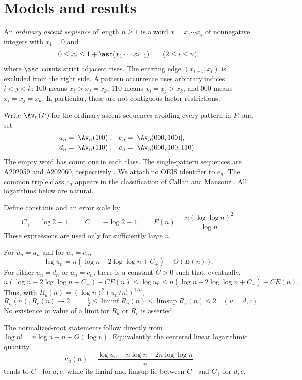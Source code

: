 \section{Models and results}\label{sec:results}
An \emph{ordinary ascent sequence} of length $n\ge1$ is a word $x=x_1\cdots x_n$ of nonnegative integers with $x_1=0$ and
\begin{equation}\label{eq:ascent}
 0\le x_i\le1+\asc(x_1\cdots x_{i-1})\qquad(2\le i\le n),
\end{equation}
where $\asc$ counts strict adjacent rises. The entering edge $(x_{i-1},x_i)$ is excluded from the right side. A pattern occurrence uses arbitrary indices $i<j<k$: $100$ means $x_i>x_j=x_k$, $110$ means $x_i=x_j>x_k$, and $000$ means $x_i=x_j=x_k$. In particular, these are not contiguous-factor restrictions.

Write $\Av_n(P)$ for the ordinary ascent sequences avoiding every pattern in $P$, and set
\begin{align*}
 a_n&=|\Av_n(100)|,&e_n&=|\Av_n(000,100)|,\\
 d_n&=|\Av_n(110)|,&c_n&=|\Av_n(000,100,110)|.
\end{align*}
The empty word has count one in each class. The single-pattern sequences are A202059 and A202060, respectively \cite{conway,oeis100,oeis110}. We attach no OEIS identifier to $e_n$. The common triple class $c_n$ appears in the classification of Callan and Mansour \cite{callan}. All logarithms below are natural.

Define constants and an error scale by
\begin{equation}\label{eq:constants}
 C_+=\log2-1,\qquad C_-=-\log2-1,\qquad
 E(n)=\frac{n(\log\log n)^2}{\log n}.
\end{equation}
These expressions are used only for sufficiently large $n$.
\begin{theorem}\label{thm:main}
For $u_n=a_n$ and for $u_n=e_n$,
\begin{equation}\label{eq:main}
 \log u_n=n(\log n-2\log\log n+C_+)+O(E(n)).
\end{equation}
For either $u_n=d_n$ or $u_n=c_n$, there is a constant $C>0$ such that, eventually,
\begin{equation}\label{eq:bracket}
 n(\log n-2\log\log n+C_-)-CE(n)
 \le \log u_n
 \le n(\log n-2\log\log n+C_+)+CE(n).
\end{equation}
Thus, with $R_u(n)=(\log n)^2(u_n/n!)^{1/n}$,
\begin{equation}\label{eq:roots}
 R_a(n),R_e(n)\longrightarrow2,\qquad
 \tfrac12\le\liminf R_u(n)\le\limsup R_u(n)\le2
 \quad(u=d,c).
\end{equation}
No existence or value of a limit for $R_d$ or $R_c$ is asserted.
\end{theorem}
The normalized-root statements follow directly from $\log n!=n\log n-n+O(\log n)$. Equivalently, the centered linear logarithmic quantity
\[
 \kappa_u(n)=\frac{\log u_n-n\log n+2n\log\log n}{n}
\]
tends to $C_+$ for $a,e$, while its liminf and limsup lie between $C_-$ and $C_+$ for $d,c$.

